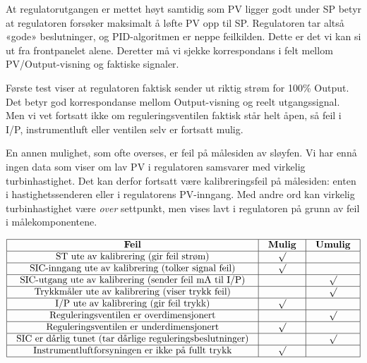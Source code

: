 





At regulatorutgangen er mettet høyt samtidig som PV ligger godt under SP betyr at regulatoren forsøker maksimalt å løfte PV opp til SP. Regulatoren tar altså «gode» beslutninger, og PID-algoritmen er neppe feilkilden. Dette er det vi kan si ut fra frontpanelet alene. Deretter må vi sjekke korrespondans i felt mellom PV/Output-visning og faktiske signaler.

\vskip 10pt

Første test viser at regulatoren faktisk sender ut riktig strøm for 100\% Output. Det betyr god korrespondanse mellom Output-visning og reelt utgangssignal. Men vi vet fortsatt ikke om reguleringsventilen faktisk står helt åpen, så feil i I/P, instrumentluft eller ventilen selv er fortsatt mulig.

\vskip 10pt

En annen mulighet, som ofte overses, er feil på målesiden av sløyfen. Vi har ennå ingen data som viser om lav PV i regulatoren samsvarer med virkelig turbinhastighet. Det kan derfor fortsatt være kalibreringsfeil på målesiden: enten i hastighetssenderen eller i regulatorens PV-inngang. Med andre ord kan virkelig turbinhastighet være {\it over} settpunkt, men vises lavt i regulatoren på grunn av feil i målekomponentene.


$$\vbox{\offinterlineskip
\halign{\strut
\vrule \quad\hfil # \ \hfil & 
\vrule \quad\hfil # \ \hfil & 
\vrule \quad\hfil # \ \hfil \vrule \cr
\noalign{\hrule}
%
{\bf Feil} & {\bf Mulig} & {\bf Umulig} \cr
%
\noalign{\hrule}
%
ST ute av kalibrering (gir feil strøm) & $\surd$ &  \cr
%
\noalign{\hrule}
%
SIC-inngang ute av kalibrering (tolker signal feil) & $\surd$ &  \cr
%
\noalign{\hrule}
%
SIC-utgang ute av kalibrering (sender feil mA til I/P) &  & $\surd$ \cr
%
\noalign{\hrule}
%
Trykkmåler ute av kalibrering (viser trykk feil) &  & $\surd$ \cr
%
\noalign{\hrule}
%
I/P ute av kalibrering (gir feil trykk) & $\surd$ &  \cr
%
\noalign{\hrule}
%
Reguleringsventilen er overdimensjonert &  & $\surd$ \cr
%
\noalign{\hrule}
%
Reguleringsventilen er underdimensjonert & $\surd$ &  \cr
%
\noalign{\hrule}
%
SIC er dårlig tunet (tar dårlige reguleringsbeslutninger) &  & $\surd$ \cr
%
\noalign{\hrule}
%
Instrumentluftforsyningen er ikke på fullt trykk & $\surd$ &  \cr
%
\noalign{\hrule}
} %
}$$ %


